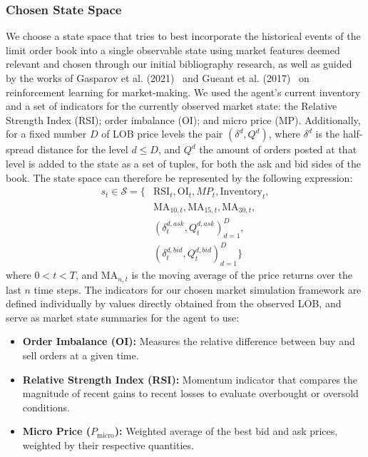 \subsubsection{Chosen State Space}
We choose a state space that tries to best incorporate the historical events of the limit order book into a single observable state using
market features deemed relevant and chosen through our initial bibliography research,
as well as guided by the works of
Gasparov et al. (2021)~\cite{Gasperov2021} and Gueant et al. (2017)~\cite{Gueant2017} on reinforcement learning for market-making.
We used the agent's current inventory and a set of indicators for the currently observed market state:
the Relative Strength Index (RSI); order imbalance (OI); and micro price (MP).
Additionally, for a fixed number $D$ of LOB price levels the pair $(\delta^d, Q^d)$, where $\delta^d$ is the half-spread distance for the level $d \leq D$,
and $Q^d$ the amount of orders posted at that level is added to the state as a set of tuples, for both the ask and bid sides of the book.
The state space can therefore be represented by the following expression:
\begin{equation*}
    \begin{aligned}
        s_{t} \in \mathcal{S} = \big\{ &\text{RSI}_t, \text{OI}_t, MP_{t}, \text{Inventory}_t, \\
        & \text{MA}_{10, t}, \text{MA}_{15, t}, \text{MA}_{30, t}, \\
        & (\delta_t^{d, ask}, Q_t^{d, ask})_{d=1}^{D}, \\
        & (\delta_t^{d, bid}, Q_t^{d, bid})_{d=1}^{D} \big\}
    \end{aligned}\label{eq:equation}
\end{equation*}
where $0 < t < T$, and $\text{MA}_{n, t}$ is the moving average of the price returns over the last $n$ time steps.
The indicators for our chosen market simulation framework are defined individually by values directly obtained from the observed LOB,
and serve as market state summaries for the agent to use:

\begin{itemize}
    \item \textbf{Order Imbalance (OI):} Measures the relative difference between buy and sell orders at a given time.
    \item \textbf{Relative Strength Index (RSI):} Momentum indicator that compares the magnitude of recent gains to recent losses to evaluate overbought or oversold conditions.
    \item \textbf{Micro Price (\( P_{\text{micro}} \)):} Weighted average of the best bid and ask prices, weighted by their respective quantities.
\end{itemize}

